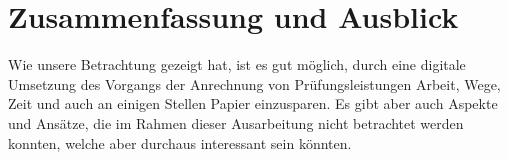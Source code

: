 \chapter{Zusammenfassung und Ausblick}

Wie unsere Betrachtung gezeigt hat, ist es gut möglich, durch eine digitale Umsetzung des Vorgangs der Anrechnung von Prüfungsleistungen Arbeit, Wege, Zeit und auch an einigen Stellen Papier einzusparen. Es gibt aber auch Aspekte und Ansätze, die im Rahmen dieser Ausarbeitung nicht betrachtet werden konnten, welche aber durchaus interessant sein könnten.





